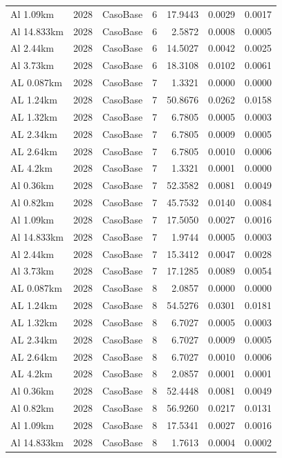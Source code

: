 \documentclass[11pt,a4paper]{article}
\begin{document}
\begin{longtable}{llllrrr}
Al 1.09km & 2028 & CasoBase & 6 & 17.9443 & 0.0029 & 0.0017 \\
Al 14.833km & 2028 & CasoBase & 6 & 2.5872 & 0.0008 & 0.0005 \\
Al 2.44km & 2028 & CasoBase & 6 & 14.5027 & 0.0042 & 0.0025 \\
Al 3.73km & 2028 & CasoBase & 6 & 18.3108 & 0.0102 & 0.0061 \\
AL 0.087km & 2028 & CasoBase & 7 & 1.3321 & 0.0000 & 0.0000 \\
AL 1.24km & 2028 & CasoBase & 7 & 50.8676 & 0.0262 & 0.0158 \\
AL 1.32km & 2028 & CasoBase & 7 & 6.7805 & 0.0005 & 0.0003 \\
AL 2.34km & 2028 & CasoBase & 7 & 6.7805 & 0.0009 & 0.0005 \\
AL 2.64km & 2028 & CasoBase & 7 & 6.7805 & 0.0010 & 0.0006 \\
AL 4.2km & 2028 & CasoBase & 7 & 1.3321 & 0.0001 & 0.0000 \\
Al 0.36km & 2028 & CasoBase & 7 & 52.3582 & 0.0081 & 0.0049 \\
Al 0.82km & 2028 & CasoBase & 7 & 45.7532 & 0.0140 & 0.0084 \\
Al 1.09km & 2028 & CasoBase & 7 & 17.5050 & 0.0027 & 0.0016 \\
Al 14.833km & 2028 & CasoBase & 7 & 1.9744 & 0.0005 & 0.0003 \\
Al 2.44km & 2028 & CasoBase & 7 & 15.3412 & 0.0047 & 0.0028 \\
Al 3.73km & 2028 & CasoBase & 7 & 17.1285 & 0.0089 & 0.0054 \\
AL 0.087km & 2028 & CasoBase & 8 & 2.0857 & 0.0000 & 0.0000 \\
AL 1.24km & 2028 & CasoBase & 8 & 54.5276 & 0.0301 & 0.0181 \\
AL 1.32km & 2028 & CasoBase & 8 & 6.7027 & 0.0005 & 0.0003 \\
AL 2.34km & 2028 & CasoBase & 8 & 6.7027 & 0.0009 & 0.0005 \\
AL 2.64km & 2028 & CasoBase & 8 & 6.7027 & 0.0010 & 0.0006 \\
AL 4.2km & 2028 & CasoBase & 8 & 2.0857 & 0.0001 & 0.0001 \\
Al 0.36km & 2028 & CasoBase & 8 & 52.4448 & 0.0081 & 0.0049 \\
Al 0.82km & 2028 & CasoBase & 8 & 56.9260 & 0.0217 & 0.0131 \\
Al 1.09km & 2028 & CasoBase & 8 & 17.5341 & 0.0027 & 0.0016 \\
Al 14.833km & 2028 & CasoBase & 8 & 1.7613 & 0.0004 & 0.0002 \\

\end{longtable}
\end{document}
